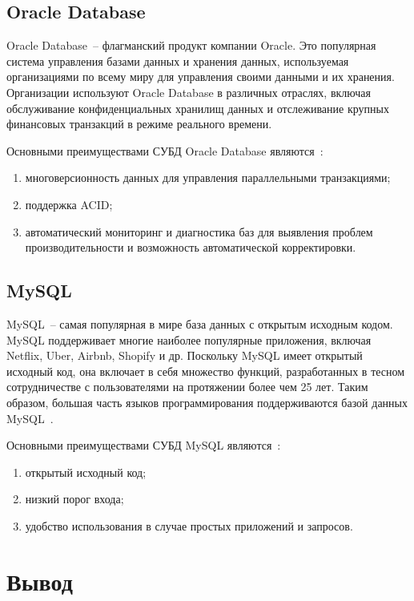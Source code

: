 \subsection{Oracle Database}

Oracle Database~-- флагманский продукт компании Oracle.
Это популярная система управления базами данных и хранения данных, используемая организациями по всему миру для управления своими данными и их хранения.
Организации используют Oracle Database в различных отраслях, включая обслуживание конфиденциальных хранилищ данных и отслеживание крупных финансовых транзакций в режиме реального времени.

Основными преимуществами СУБД Oracle Database являются~\cite{cmpSCDB5}:
\begin{enumerate}
	\item многоверсионность данных для управления параллельными транзакциями;
	\item поддержка ACID;
	\item автоматический мониторинг и диагностика баз для выявления проблем производительности и возможность автоматической корректировки.
\end{enumerate}

\subsection{MySQL}

MySQL~-- самая популярная в мире база данных с открытым исходным кодом.
MySQL поддерживает многие наиболее популярные приложения, включая Netflix, Uber, Airbnb, Shopify и др.
Поскольку MySQL имеет открытый исходный код, она включает в себя множество функций, разработанных в тесном сотрудничестве с пользователями на протяжении более чем 25 лет.
Таким образом, большая часть языков программирования поддерживаются базой данных MySQL~\cite{mysql}.

Основными преимуществами СУБД MySQL являются~\cite{cmpSCDB1, cmpSCDB2, cmpSCDB3}:
\begin{enumerate}
	\item открытый исходный код;
	\item низкий порог входа;
	\item удобство использования в случае простых приложений и запросов.
\end{enumerate}

\section*{Вывод}

